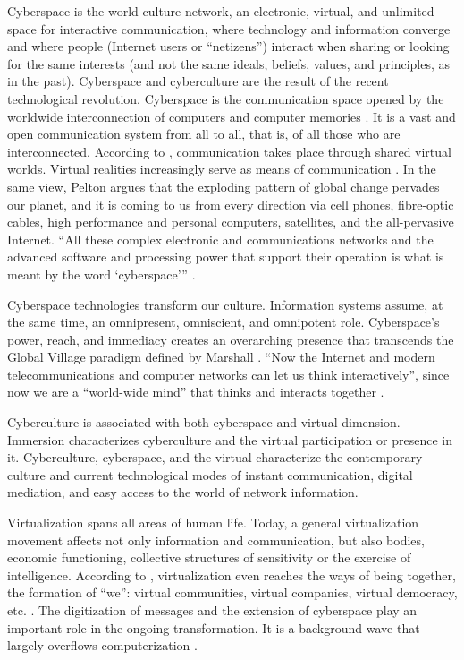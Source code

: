 \documentclass[english]{textolivre}
\begin{document}
Cyberspace is the world-culture network, an electronic, virtual, and unlimited space for interactive communication, where technology and information converge and where people (Internet users or “netizens”) interact when sharing or looking for the same interests (and not the same ideals, beliefs, values, and principles, as in the past). Cyberspace and cyberculture are the result of the recent technological revolution. Cyberspace is the communication space opened by the worldwide interconnection of computers and computer memories \cite[p.~92]{levy_cibercultura_1999b}. It is a vast and open communication system from all to all, that is, of all those who are interconnected. According to \textcite{levy_cibercultura_1999b}, communication takes place through shared virtual worlds. Virtual realities increasingly serve as means of communication \cite[p.~105]{levy_cibercultura_1999b}. In the same view, Pelton argues that the exploding pattern of global change pervades our planet, and it is coming to us from every direction via cell phones, fibre-optic cables, high performance and personal computers, satellites, and the all-pervasive Internet. “All these complex electronic and communications networks and the advanced software and processing power that support their operation is what is meant by the word ‘cyberspace’” \cite[p.~3]{pelton_e-sphere:_2000}.

Cyberspace technologies transform our culture. Information systems assume, at the same time, an omnipresent, omniscient, and omnipotent role. Cyberspace’s power, reach, and immediacy creates an overarching presence that transcends the Global Village paradigm defined by Marshall \textcite{mcluhan_understanding_1994}. “Now the Internet and modern telecommunications and computer networks can let us think interactively”, since now we are a “world-wide mind” that thinks and interacts together \cite[p.~4]{pelton_e-sphere:_2000}.

Cyberculture is associated with both cyberspace and virtual dimension. Immersion characterizes cyberculture and the virtual participation or presence in it. Cyberculture, cyberspace, and the virtual characterize the contemporary culture and current technological modes of instant communication, digital mediation, and easy access to the world of network information.

Virtualization spans all areas of human life. Today, a general virtualization movement affects not only information and communication, but also bodies, economic functioning, collective structures of sensitivity or the exercise of intelligence. According to \textcite{levy_que_1999a}, virtualization even reaches the ways of being together, the formation of “we”: virtual communities, virtual companies, virtual democracy, etc. \cite[p.~7]{levy_que_1999a}. The digitization of messages and the extension of cyberspace play an important role in the ongoing transformation. It is a background wave that largely overflows computerization \cite[p.~7]{levy_que_1999a}.
\end{document}
